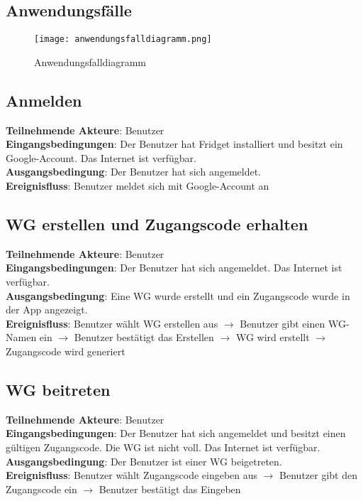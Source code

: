 \begin{flushleft}
        \section{Anwendungsfälle}
        	\begin{figure}[H]
        		\centering
        		\texttt{[image: anwendungsfalldiagramm.png]}
        		\caption{Anwendungsfalldiagramm}
        	\end{figure}
        	
        	\subsection{Anmelden}
        \textbf{Teilnehmende Akteure}: Benutzer \\
		\textbf{Eingangsbedingungen}: Der Benutzer hat Fridget installiert und besitzt ein Google-Account. Das Internet ist verfügbar. \\
		\textbf{Ausgangsbedingung}: Der Benutzer hat sich angemeldet. \\
		\textbf{Ereignisfluss}: Benutzer meldet sich mit Google-Account an
		
		\subsection{WG erstellen und Zugangscode erhalten}
		\textbf{Teilnehmende Akteure}: Benutzer \\
		\textbf{Eingangsbedingungen}: Der Benutzer hat sich angemeldet. Das Internet ist verfügbar. \\
		\textbf{Ausgangsbedingung}: Eine WG wurde erstellt und ein Zugangscode wurde in der App angezeigt. \\
		\textbf{Ereignisfluss}: Benutzer wählt WG erstellen aus $\rightarrow$ Benutzer gibt einen WG-Namen ein $\rightarrow$ Benutzer bestätigt das Erstellen $\rightarrow$ WG wird erstellt $\rightarrow$ Zugangscode wird generiert
		
		\subsection{WG beitreten}
		\textbf{Teilnehmende Akteure}: Benutzer \\
		\textbf{Eingangsbedingungen}: Der Benutzer hat sich angemeldet und besitzt einen gültigen Zugangscode. Die WG ist nicht voll. Das Internet ist verfügbar. \\
		\textbf{Ausgangsbedingung}: Der Benutzer ist einer WG beigetreten. \\
		\textbf{Ereignisfluss}: Benutzer wählt Zugangscode eingeben aus $\rightarrow$ Benutzer gibt den Zugangscode ein $\rightarrow$ Benutzer bestätigt das Eingeben
		

\end{flushleft}

